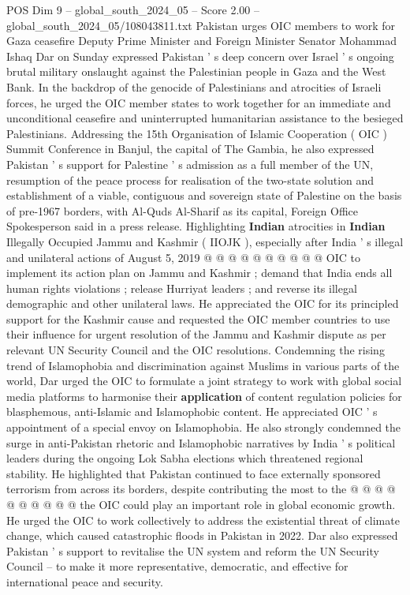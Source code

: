 \begin{textsample}{POS Dim 9 – global\_south\_2024\_05 – Score 2.00 – global\_south\_2024\_05/108043811.txt}  \label{ex:f9_pos_039}
Pakistan urges OIC members to work for Gaza ceasefire Deputy Prime Minister and Foreign Minister Senator Mohammad Ishaq Dar on Sunday expressed Pakistan ' s deep concern over Israel ' s ongoing brutal military onslaught against the Palestinian people in Gaza and the West Bank.
In the backdrop of the genocide of Palestinians and atrocities of Israeli forces, he urged the OIC member states to work together for an immediate and unconditional ceasefire and uninterrupted humanitarian assistance to the besieged Palestinians.
Addressing the 15th Organisation of Islamic Cooperation ( OIC ) Summit Conference in Banjul, the capital of The Gambia, he also expressed Pakistan ' s support for Palestine ' s admission as a full member of the UN, resumption of the peace process for realisation of the two-state solution and establishment of a viable, contiguous and sovereign state of Palestine on the basis of pre-1967 borders, with Al-Quds Al-Sharif as its capital, Foreign Office Spokesperson said in a press release.
Highlighting \textbf{Indian} atrocities in \textbf{Indian} Illegally Occupied Jammu and Kashmir ( IIOJK ), especially after India ' s illegal and unilateral actions of August 5, 2019 @ @ @ @ @ @ @ @ @ @ OIC to implement its action plan on Jammu and Kashmir ; demand that India ends all human rights violations ; release Hurriyat leaders ; and reverse its illegal demographic and other unilateral laws.
He appreciated the OIC for its principled support for the Kashmir cause and requested the OIC member countries to use their influence for urgent resolution of the Jammu and Kashmir dispute as per relevant UN Security Council and the OIC resolutions.
Condemning the rising trend of Islamophobia and discrimination against Muslims in various parts of the world, Dar urged the OIC to formulate a joint strategy to work with global social media platforms to harmonise their \textbf{application} of content regulation policies for blasphemous, anti-Islamic and Islamophobic content.
He appreciated OIC ' s appointment of a special envoy on Islamophobia.
He also strongly condemned the surge in anti-Pakistan rhetoric and Islamophobic narratives by India ' s political leaders during the ongoing Lok Sabha elections which threatened regional stability.
He highlighted that Pakistan continued to face externally sponsored terrorism from across its borders, despite contributing the most to the @ @ @ @ @ @ @ @ @ @ the OIC could play an important role in global economic growth.
He urged the OIC to work collectively to address the existential threat of climate change, which caused catastrophic floods in Pakistan in 2022.
Dar also expressed Pakistan ' s support to revitalise the UN system and reform the UN Security Council -- to make it more representative, democratic, and effective for international peace and security.

\end{textsample}
